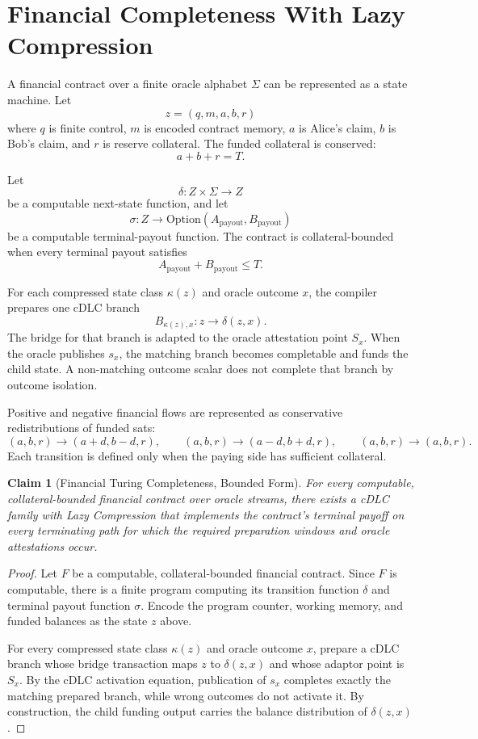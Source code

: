\documentclass[11pt,a4paper]{article}
\theoremstyle{claimstyle}
\newtheorem{claim}{Claim}[section]
\begin{document}
\section{Financial Completeness With Lazy Compression}
\label{sec:financial-completeness}

A financial contract over a finite oracle alphabet $\Sigma$ can be represented
as a state machine. Let
\[
  z = (q, m, a, b, r)
\]
where $q$ is finite control, $m$ is encoded contract memory, $a$ is Alice's
claim, $b$ is Bob's claim, and $r$ is reserve collateral. The funded collateral
is conserved:
\[
  a + b + r = T.
\]

Let
\[
  \delta : Z \times \Sigma \to Z
\]
be a computable next-state function, and let
\[
  \sigma : Z \to \mathrm{Option}(A_{\mathrm{payout}}, B_{\mathrm{payout}})
\]
be a computable terminal-payout function. The contract is collateral-bounded
when every terminal payout satisfies
\[
  A_{\mathrm{payout}} + B_{\mathrm{payout}} \leq T.
\]

For each compressed state class $\kappa(z)$ and oracle outcome $x$, the
compiler prepares one cDLC branch
\[
  B_{\kappa(z),x}: z \to \delta(z,x).
\]
The bridge for that branch is adapted to the oracle attestation point $S_x$.
When the oracle publishes $s_x$, the matching branch becomes completable and
funds the child state. A non-matching outcome scalar does not complete that
branch by outcome isolation.

Positive and negative financial flows are represented as conservative
redistributions of funded sats:
\[
  (a,b,r) \to (a+d,b-d,r),\qquad
  (a,b,r) \to (a-d,b+d,r),\qquad
  (a,b,r) \to (a,b,r).
\]
Each transition is defined only when the paying side has sufficient collateral.

\begin{claim}[Financial Turing Completeness, Bounded Form]
For every computable, collateral-bounded financial contract over oracle streams,
there exists a cDLC family with Lazy Compression that implements the contract's
terminal payoff on every terminating path for which the required preparation
windows and oracle attestations occur.
\end{claim}
\begin{proof}
Let $F$ be a computable, collateral-bounded financial contract. Since $F$ is
computable, there is a finite program computing its transition function
$\delta$ and terminal payout function $\sigma$. Encode the program counter,
working memory, and funded balances as the state $z$ above.

For every compressed state class $\kappa(z)$ and oracle outcome $x$, prepare a
cDLC branch whose bridge transaction maps $z$ to $\delta(z,x)$ and whose
adaptor point is $S_x$. By the cDLC activation equation, publication of $s_x$
completes exactly the matching prepared branch, while wrong outcomes do not
activate it. By construction, the child funding output carries the balance
distribution of $\delta(z,x)$.
\end{proof}
\end{document}
